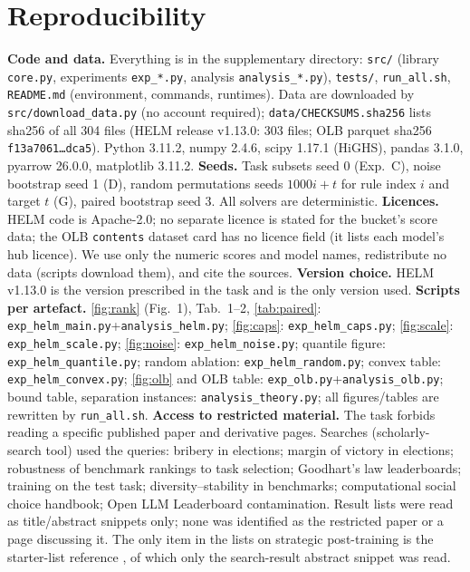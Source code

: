 \section{Reproducibility}\label{app:repro}
\textbf{Code and data.} Everything is in the supplementary directory: \texttt{src/} (library \texttt{core.py}, experiments \texttt{exp\_*.py}, analysis \texttt{analysis\_*.py}), \texttt{tests/}, \texttt{run\_all.sh}, \texttt{README.md} (environment, commands, runtimes). Data are downloaded by \texttt{src/download\_data.py} (no account required); \texttt{data/CHECKSUMS.sha256} lists sha256 of all 304 files (HELM release v1.13.0: 303 files; OLB parquet sha256 \texttt{f13a7061\ldots dca5}). Python 3.11.2, numpy 2.4.6, scipy 1.17.1 (HiGHS), pandas 3.1.0, pyarrow 26.0.0, matplotlib 3.11.2.
\textbf{Seeds.} Task subsets seed 0 (Exp.\ C), noise bootstrap seed 1 (D), random permutations seeds $1000i+t$ for rule index $i$ and target $t$ (G), paired bootstrap seed 3. All solvers are deterministic.
\textbf{Licences.} HELM code is Apache-2.0; no separate licence is stated for the bucket's score data; the OLB \texttt{contents} dataset card has no licence field (it lists each model's hub licence). We use only the numeric scores and model names, redistribute no data (scripts download them), and cite the sources.
\textbf{Version choice.} HELM v1.13.0 is the version prescribed in the task and is the only version used.
\textbf{Scripts per artefact.} \cref{fig:rank} (Fig.\ 1), Tab.\ 1--2, \cref{tab:paired}: \texttt{exp\_helm\_main.py}+\texttt{analysis\_helm.py}; \cref{fig:caps}: \texttt{exp\_helm\_caps.py}; \cref{fig:scale}: \texttt{exp\_helm\_scale.py}; \cref{fig:noise}: \texttt{exp\_helm\_noise.py}; quantile figure: \texttt{exp\_helm\_quantile.py}; random ablation: \texttt{exp\_helm\_random.py}; convex table: \texttt{exp\_helm\_convex.py}; \cref{fig:olb} and OLB table: \texttt{exp\_olb.py}+\texttt{analysis\_olb.py}; bound table, separation instances: \texttt{analysis\_theory.py}; all figures/tables are rewritten by \texttt{run\_all.sh}.
\textbf{Access to restricted material.} The task forbids reading a specific published paper and derivative pages. Searches (scholarly-search tool) used the queries: bribery in elections; margin of victory in elections; robustness of benchmark rankings to task selection; Goodhart's law leaderboards; training on the test task; diversity--stability in benchmarks; computational social choice handbook; Open LLM Leaderboard contamination. Result lists were read as title/abstract snippets only; none was identified as the restricted paper or a page discussing it. The only item in the lists on strategic post-training is the starter-list reference \cite{chen2026leaderboard}, of which only the search-result abstract snippet was read.
